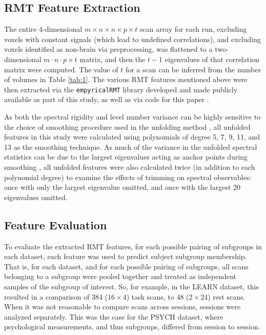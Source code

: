 \documentclass[10pt]{article}
\begin{document}
\subsection{RMT Feature Extraction}
The entire 4-dimensional \(m \times n \times n \times p \times t\) scan array for each run,
excluding voxels with constant signals (which lead to undefined correlations), and excluding voxels
identified as non-brain via preprocessing, was flattened to a two-dimensional \(m \cdot n \cdot p
\times t\) matrix, and then the \(t - 1\) eigenvalues of that correlation matrix were computed. The
value of \(t\) for a scan can be inferred from the number of volumes in Table \ref{tab:1}. The
various RMT features mentioned above were then extracted via the \texttt{empyricalRMT} library
\citep{bergerStfxecutablesEmpyricalRMTPreliminary2020} developed and made publicly available as part
of this study, as well as via code for this paper \citep{bergerderekm.DMBergerRandommatrixfmriV02020}.

As both the spectral rigidity and level number variance can be highly sensitive to the choice of
smoothing procedure used in the unfolding method
\citep{abul-magdUnfoldingSpectrumChaotic2014,moralesImprovedUnfoldingDetrending2011,abueleninSpectralUnfoldingChaotic2018,fossionRandommatrixSpectraTime2013,abueleninEffectUnfoldingSpectral2012},
all unfolded features in this study were calculated using polynomials of degree 5, 7, 9, 11, and 13
as the smoothing technique. As much of the variance in the unfolded spectral statistics can be due
to the largest eigenvalues acting as anchor points during smoothing
\citep{moralesImprovedUnfoldingDetrending2011,abueleninEffectUnfoldingSpectral2012}, all unfolded
features were also calculated twice (in addition to each polynomial degree) to examine the effects
of trimming on spectral observables: once with only the largest eigenvalue omitted, and once with
the largest 20 eigenvalues omitted.

\subsection{Feature Evaluation}
To evaluate the extracted RMT features, for each possible pairing of subgroups in each dataset, each
feature was used to predict subject subgroup membership. That is, for each dataset, and for each
possible pairing of subgroups, all scans belonging to a subgroup were pooled together and treated as
independent samples of the subgroup of interest. So, for example, in the LEARN dataset, this
resulted in a comparison of 384 (\(16 \times 4\)) task scans, to 48 (\(2 \times 24\)) rest scans. When it was not
reasonable to compare scans across sessions, sessions were analyzed separately. This was the case
for the PSYCH dataset, where psychological measurements, and thus subgroups, differed from session
to session.
\end{document}
